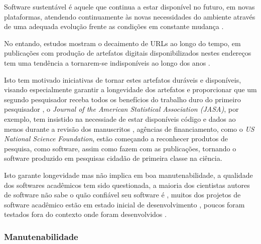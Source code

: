 Software sustentável é aquele que continua a estar disponível no futuro, em
novas plataformas, atendendo continuamente às novas necessidades do ambiente
através de uma adequada evolução frente as condições em constante mudança
\cite{allen2017engineering}.

No entando, estudos mostram o decaimento de URLs ao longo do tempo, em
publicações com produção de artefatos digitais disponibilizados nestes
endereços tem uma tendência a tornarem-se indisponíveis ao longo dos anos
\cite{wren2017use}.

Isto tem motivado iniciativas de tornar estes artefatos duráveis e disponíveis,
visando especialmente garantir a longevidade dos artefatos e proporcionar que
um segundo pesquisador receba todos os benefícios do trabalho duro do primeiro
pesquisador \cite{king1995replication},
o {\it Journal of the American Statistical Association (JASA)}, por
exemplo, tem insistido na necessiade de estar disponíveis código e dados ao
menos durante a revisão dos manuscritos \cite{baker2016scientists}, agências de
financiamento, como o {\it US National Science Foundation}, estão começando a
reconhecer produtos de pesquisa, como software, assim como fazem com as
publicações, tornando o software produzido em pesquisas cidadão de primeira
classe na ciência.

%

Isto garante longevidade mas não implica em boa manutenabilidade, a qualidade
dos softwares acadêmicos tem sido questionada, a maioria dos cientistas autores
de software não sabe o quão confiável seu software é
\cite{Merali2010Computational}, muitos dos projetos de software acadêmico estão
em estado inicial de desenvolvimento \cite{marshall2013tools}, poucos foram
testados fora do contexto onde foram desenvolvidos \cite{Portillo12}.

\subsubsection{Manutenabilidade}

